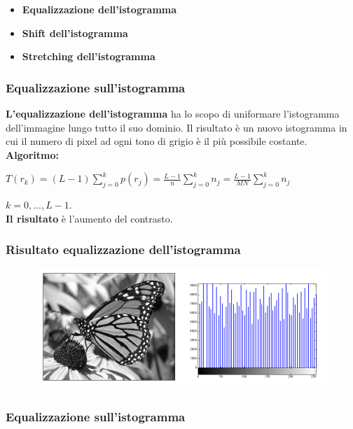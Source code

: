 \begin{itemize}
    \item \textbf{Equalizzazione dell’istogramma}
    \item \textbf{Shift dell’istogramma}
    \item \textbf{Stretching dell’istogramma}
\end{itemize}

\subsubsection{Equalizzazione sull'istogramma}

\textbf{L'equalizzazione dell’istogramma} ha lo scopo di uniformare l’istogramma dell’immagine lungo tutto il suo dominio. Il risultato
è un nuovo istogramma in cui il numero di pixel ad ogni tono di grigio è il più possibile costante.
\\\textbf{Algoritmo:}

\begin{center}
    $T(r_k) = (L-1)\sum_{j=0}^{k}p(r_j)=\frac{L-1}{n} \sum_{j=0}^{k}n_j = \frac{L-1}{MN}\sum_{j=0}^{k}n_j$
\end{center}

$k=0,...,L-1$.
\\\textbf{Il risultato} è l'aumento del contrasto.

\subsubsection{Risultato equalizzazione dell'istogramma}

\begin{figure}[H]
    \centering
    \includegraphics[width=\linewidth, keepaspectratio]{capitoli/immagini/imgs/eq-istogramma.png}
\end{figure}

\subsubsection{Equalizzazione sull'istogramma}

